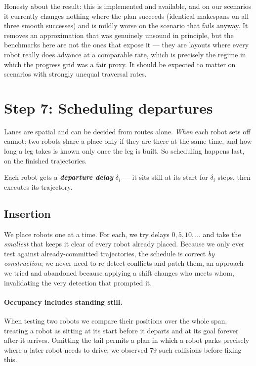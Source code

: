 \documentclass[11pt,a4paper]{article}
\newcommand{\defn}[1]{\textbf{\textit{#1}}}
\begin{document}
Honesty about the result: this is implemented and available, and on our scenarios it
currently changes nothing where the plan succeeds (identical makespans on all three smooth
successes) and is mildly worse on the scenario that fails anyway. It removes an
approximation that was genuinely unsound in principle, but the benchmarks here are not the
ones that expose it --- they are layouts where every robot really does advance at a
comparable rate, which is precisely the regime in which the progress grid was a fair proxy.
It should be expected to matter on scenarios with strongly unequal traversal rates.

\section{Step 7: Scheduling departures}
\label{sec:sched}

Lanes are spatial and can be decided from routes alone. \emph{When} each robot sets off
cannot: two robots share a place only if they are there at the same time, and how long a leg
takes is known only once the leg is built. So scheduling happens last, on the finished
trajectories.

Each robot gets a \defn{departure delay} $\delta_i$ --- it sits still at its start for
$\delta_i$ steps, then executes its trajectory.

\subsection{Insertion}

We place robots one at a time. For each, we try delays $0, 5, 10, \dots$ and take the
\emph{smallest} that keeps it clear of every robot already placed. Because we only ever test
against already-committed trajectories, the schedule is correct \emph{by construction}; we
never need to re-detect conflicts and patch them, an approach we tried and abandoned
because applying a shift changes who meets whom, invalidating the very detection that
prompted it.

\paragraph{Occupancy includes standing still.} When testing two robots we compare their
positions over the whole span, treating a robot as sitting at its start before it departs
and at its goal forever after it arrives. Omitting the tail permits a plan in which a robot
parks precisely where a later robot needs to drive; we observed $79$ such collisions before
fixing this.
\end{document}
